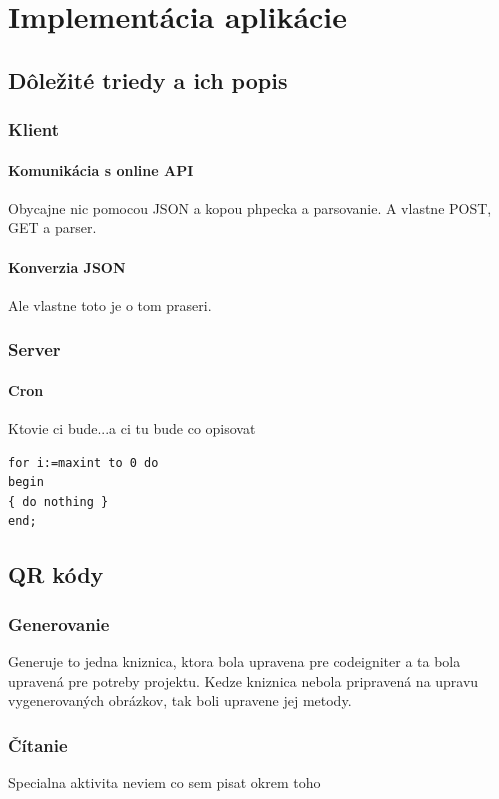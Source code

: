 \chapter{Implementácia aplikácie}


\section{Dôležité triedy a ich popis}
\subsection{Klient}
\subsubsection{Komunikácia s online API}
Obycajne nic pomocou JSON a kopou phpecka a parsovanie. A vlastne POST, GET a parser.
\subsubsection{Konverzia JSON}
Ale vlastne toto je o tom praseri.
\subsection{Server}
\subsubsection{Cron}
Ktovie ci bude...a ci tu bude co opisovat

\lstset{language=Java}          %

\begin{lstlisting}[frame=single]  % Start your code-block
for i:=maxint to 0 do
begin
{ do nothing }
end;
\end{lstlisting}

\section{QR kódy}
\subsection{Generovanie}
Generuje to jedna kniznica, ktora bola upravena pre codeigniter a ta bola upravená pre potreby projektu. Kedze kniznica nebola pripravená na upravu vygenerovaných obrázkov, tak boli upravene jej metody.
\subsection{Čítanie}
Specialna aktivita neviem co sem pisat okrem toho


